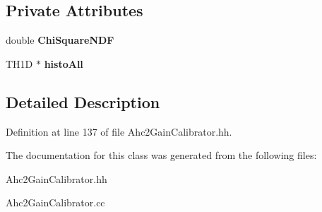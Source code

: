 \subsection*{Private Attributes}
\begin{DoxyCompactItemize}
\item 
double {\bfseries ChiSquareNDF}\label{classCALICE_1_1Ahc2GainCalibrator_1_1CalibSpectrum_a2f60c8b4e5832f12939fd991483d62e2}

\item 
TH1D $\ast$ {\bfseries histoAll}\label{classCALICE_1_1Ahc2GainCalibrator_1_1CalibSpectrum_a14d0addbe78fe019551c9c3f944006bc}

\end{DoxyCompactItemize}


\subsection{Detailed Description}


Definition at line 137 of file Ahc2GainCalibrator.hh.

The documentation for this class was generated from the following files:\begin{DoxyCompactItemize}
\item 
Ahc2GainCalibrator.hh\item 
Ahc2GainCalibrator.cc\end{DoxyCompactItemize}
